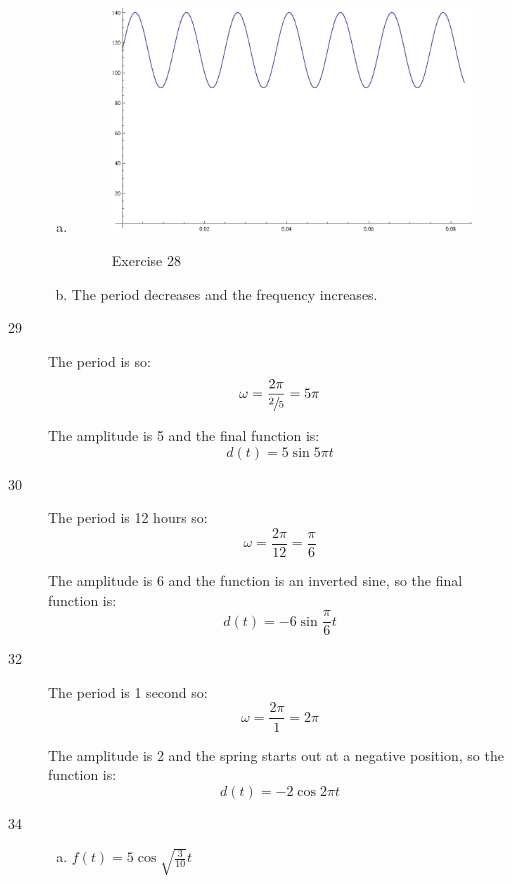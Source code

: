 \documentclass{exam}
\begin{document}
\begin{description}
\begin{enumerate}[(a)]
          \item 
            \begin{figure}[H]
              \centering
              \includegraphics{exercise28.eps}

              Exercise 28
            \end{figure}

          \item The period decreases and the frequency increases.

        \end{enumerate}

      \item[29] The period is  so: 
        \[
        \omega = \frac{2 \pi}{\sfrac{2}{5}} = 5 \pi
        \]

        The amplitude is 5 and the final function is:
        \[
          \boxed{ d(t) = 5 \sin 5 \pi t }
        \]

      \item[30] The period is 12 hours so: 
        \[
          \omega = \frac{2 \pi}{12} = \frac{\pi}{6}
        \]

        The amplitude is 6 and the function is an inverted sine, so the final function is:
        \[
          \boxed{ d(t) = -6 \sin \frac{\pi}{6} t }
        \]

      \item[32] The period is 1 second so: 
        \[
          \omega = \frac{2 \pi}{1} = 2 \pi
        \]

        The amplitude is 2 and the spring starts out at a negative position, so the function is:
        \[
          \boxed{ d(t) = -2 \cos 2 \pi t }
        \]

      \item[34]
        \begin{enumerate}[(a)]
          \item $f(t) = 5 \cos \sqrt{\frac{3}{10}} t$


\end{enumerate}
\end{description}
\end{document}
